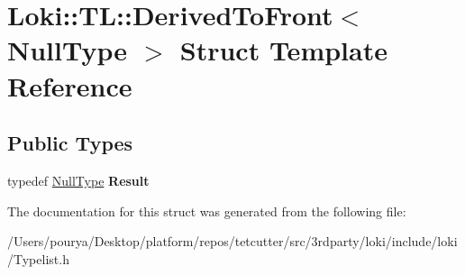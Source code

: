 \hypertarget{structLoki_1_1TL_1_1DerivedToFront_3_01NullType_01_4}{}\section{Loki\+:\+:T\+L\+:\+:Derived\+To\+Front$<$ Null\+Type $>$ Struct Template Reference}
\label{structLoki_1_1TL_1_1DerivedToFront_3_01NullType_01_4}
\subsection*{Public Types}
\begin{DoxyCompactItemize}
\item 
\hypertarget{structLoki_1_1TL_1_1DerivedToFront_3_01NullType_01_4_a54f91af307db83a6b25f5d06127a2d40}{}typedef \hyperlink{classLoki_1_1NullType}{Null\+Type} {\bfseries Result}\label{structLoki_1_1TL_1_1DerivedToFront_3_01NullType_01_4_a54f91af307db83a6b25f5d06127a2d40}

\end{DoxyCompactItemize}


The documentation for this struct was generated from the following file\+:\begin{DoxyCompactItemize}
\item 
/\+Users/pourya/\+Desktop/platform/repos/tetcutter/src/3rdparty/loki/include/loki/Typelist.\+h\end{DoxyCompactItemize}
